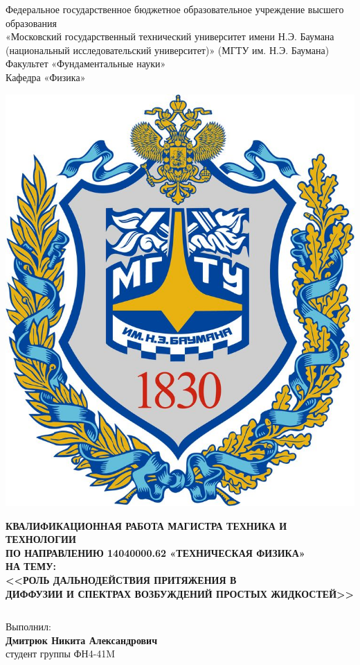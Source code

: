 \documentclass{beamer}
\begin{document}
\begin{frame}
	\begin{center}\tiny
		Федеральное государственное бюджетное образовательное учреждение высшего образования \\ «Московский государственный технический университет имени Н.Э. Баумана (национальный исследовательский университет)» (МГТУ им. Н.Э. Баумана)\\
		Факультет «Фундаментальные науки»\\
		Кафедра «Физика»\\
    \end{center}

	\begin{center}
		\includegraphics[width=0.15\linewidth]{emb}
	\end{center}

	\begin{center}
\tiny \textbf{КВАЛИФИКАЦИОННАЯ РАБОТА МАГИСТРА ТЕХНИКА И ТЕХНОЛОГИИ \\ ПО НАПРАВЛЕНИЮ 14040000.62 «ТЕХНИЧЕСКАЯ ФИЗИКА»}\\
\vspace{0.2cm}
\tiny \textbf{НА ТЕМУ:}\\
\vspace{0.1cm}
\tiny \textbf{<<РОЛЬ ДАЛЬНОДЕЙСТВИЯ ПРИТЯЖЕНИЯ В \\ ДИФФУЗИИ И СПЕКТРАХ ВОЗБУЖДЕНИЙ ПРОСТЫХ ЖИДКОСТЕЙ>>}\\
\end{center}

\vspace{0.3cm}

\begin{columns}
\begin{column}{0.50\textwidth}
\begin{center}
\tiny Выполнил: \\
\vspace{0.1cm}
\tiny \textbf{Дмитрюк Никита Александрович}\\
\tiny студент группы ФН4-41M \\
\vspace{0.2cm}
\end{center}
\end{column}



\end{columns}
\end{frame}
\end{document}

